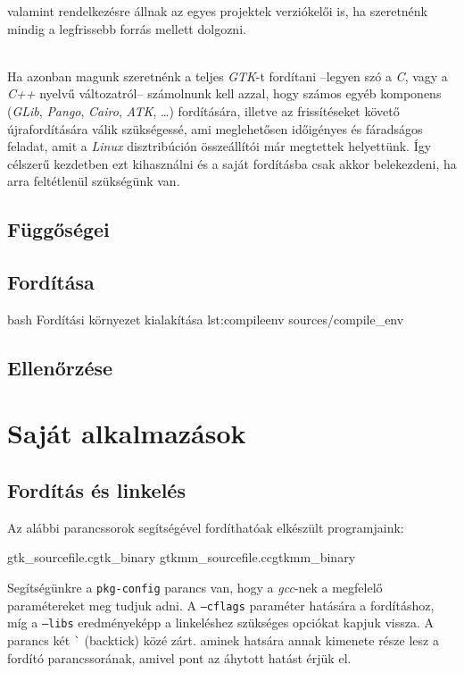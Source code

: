 valamint rendelkezésre állnak az egyes projektek verziókelői is, ha szeretnénk mindig a legfrissebb forrás mellett dolgozni.

\\

Ha azonban magunk szeretnénk a teljes \textit{GTK}-t fordítani --legyen szó a \textit{C}, vagy a \textit{C++} nyelvű változatról-- számolnunk kell azzal, hogy számos egyéb komponens (\textit{GLib}, \textit{Pango}, \textit{Cairo}, \textit{ATK}, \dots) fordítására, illetve az frissítéseket követő újrafordítására válik szükségessé, ami meglehetősen időigényes és fáradságos feladat, amit a \textit{Linux} disztribúción összeállítói már megtettek helyettünk. Így célszerű kezdetben ezt kihasználni és a saját fordításba csak akkor belekezdeni, ha arra feltétlenül szükségünk van.

\subsection{Függőségei}

\subsection{Fordítása}

\lstinputfile
{bash}
{Fordítási környezet kialakítása}
{lst:compileenv}
{sources/compile_env}

\subsection{Ellenőrzése}

\section{Saját alkalmazások}

\subsection{Fordítás és linkelés}
\label{sec:compilingandlinking}

Az alábbi parancssorok segítségével fordíthatóak elkészült programjaink:

\lstcompiles
{gtk\_sourcefile.c}{gtk\_binary}
{gtkmm\_sourcefile.cc}{gtkmm\_binary}

Segítségünkre a \texttt{pkg-config} parancs van, hogy a \textit{gcc}-nek a megfelelő paramétereket meg tudjuk adni. A \texttt{--cflags} paraméter hatására a fordításhoz, míg a \texttt{--libs} eredményeképp a linkeléshez szükséges opciókat kapjuk vissza. A parancs két \texttt{\`} (backtick) közé zárt. aminek hatsára annak kimenete része lesz a fordító parancssorának, amivel pont az áhytott hatást érjük el.


